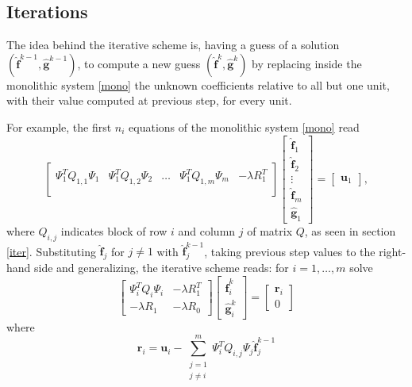 \subsection{Iterations}
\label{iterburocratico}
The idea behind the iterative scheme is, having a guess of a solution
$(\hat{\bm{f}}^{k-1},\hat{\bm{g}}^{k-1})$, to compute a new guess
$(\hat{\bm{f}}^k,\hat{\bm{g}}^k)$ by replacing inside the monolithic system
\ref{mono} the unknown coefficients relative to all but one unit, with their
value computed at previous step, for every unit.

For example, the first $n_i$ equations of the monolithic system \ref{mono} read
\begin{equation}
	\begin{bmatrix}
		\Psi_1^TQ_{1,1}\Psi_1 & \Psi_1^TQ_{1,2}\Psi_2 & \dots & \Psi_1^TQ_{1,m}\Psi_m & -\lambda R_1^T \\
	\end{bmatrix}
	\begin{bmatrix}
		\hat{\bm{f}}_1 \\
		\hat{\bm{f}}_2 \\
		\vdots         \\
		\hat{\bm{f}}_m \\
		\hat{\bm{g}}_1
	\end{bmatrix}
	=
	\begin{bmatrix}
		\bm{u}_1
	\end{bmatrix}
	,
\end{equation}
where $Q_{i,j}$ indicates block of row $i$ and column $j$ of matrix
$Q$, as seen in section \ref{iter}. Substituting $\hat{\bm{f}}_j$ for $j \neq
	1$ with $\hat{\bm{f}}_j^{k-1}$, taking previous step values to the right-hand
side and generalizing, the iterative scheme reads: for $i = 1, \dots, m$ solve
\begin{equation}
	\begin{bmatrix}
		\Psi_i^TQ_i\Psi_i & -\lambda R_1^T \\
		-\lambda R_1      & -\lambda R_0
	\end{bmatrix}
	\begin{bmatrix}
		\hat{\bm{f}}_i^k \\
		\hat{\bm{g}}_i^k
	\end{bmatrix}
	=
	\begin{bmatrix}
		\bm{r}_i \\
		0
	\end{bmatrix}
\end{equation}
where
\begin{equation}
	\bm{r}_i =\bm{u}_i -\sum_{\substack{j=1\\ j\neq i}}^m \Psi^T_iQ_{i,j} \Psi_j \hat{\bm{f}}_j^{k-1}
\end{equation}

